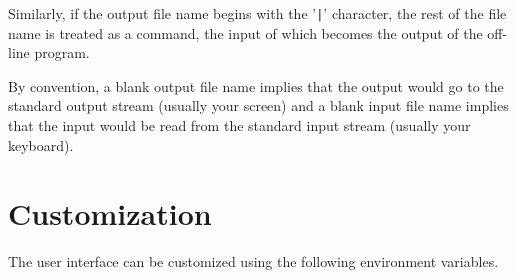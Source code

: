 \documentclass[11pt]{article}
\begin{document}
Similarly, if the output file name begins with the '{\tt |}'
character, the rest of the file name is treated as a command, the
input of which becomes the output of the off-line program.

By convention, a blank output file name implies that the output would
go to the standard output stream (usually your screen) and a blank
input file name implies that the input would be read from the standard
input stream (usually your keyboard).

\section{Customization}
\label{CUSTOMIZATION}

The user interface can be customized using the following environment
variables. 
\end{document}
